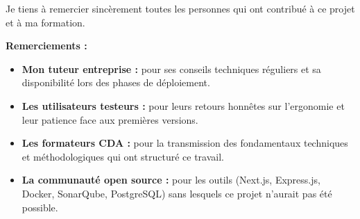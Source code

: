 Je tiens à remercier sincèrement toutes les personnes qui ont contribué à ce projet et à ma formation.

\begin{exemple}
\textbf{Remerciements :}
\begin{itemize}
    \item \textbf{Mon tuteur entreprise :} pour ses conseils techniques réguliers et sa disponibilité lors des phases de déploiement.
    \item \textbf{Les utilisateurs testeurs :} pour leurs retours honnêtes sur l'ergonomie et leur patience face aux premières versions.
    \item \textbf{Les formateurs CDA :} pour la transmission des fondamentaux techniques et méthodologiques qui ont structuré ce travail.
    \item \textbf{La communauté open source :} pour les outils (Next.js, Express.js, Docker, SonarQube, PostgreSQL) sans lesquels ce projet n'aurait pas été possible.
\end{itemize}
\end{exemple}




